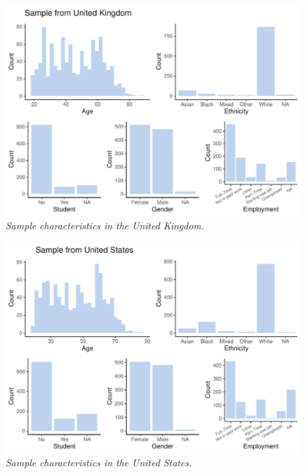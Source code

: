 \documentclass[
  man, donotrepeattitle,floatsintext]{apa6}
\begin{document}
\newpage



\begin{figure}
\centering
\includegraphics{manuscript_files/figure-latex/plotSampleUK-1.pdf}
\caption{\label{fig:plotSampleUK}\emph{Sample characteristics in the United Kingdom.}}
\end{figure}

\newpage



\begin{figure}
\centering
\includegraphics{manuscript_files/figure-latex/plotSampleUS-1.pdf}
\caption{\label{fig:plotSampleUS}\emph{Sample characteristics in the United States.}}
\end{figure}

\newpage
\end{document}
